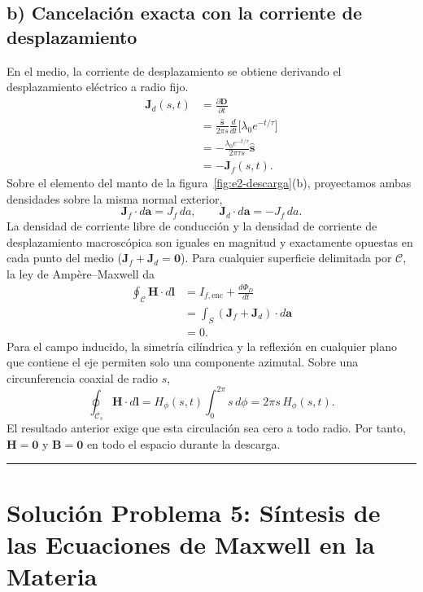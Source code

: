 \documentclass[11pt]{article}
\begin{document}
\subsection*{b) Cancelación exacta con la corriente de desplazamiento}
En el medio, la corriente de desplazamiento se obtiene derivando
el desplazamiento eléctrico a radio fijo.
\begin{align*}
    \mathbf J_d(s,t)
    &=\frac{\partial\mathbf D}{\partial t}\\
    &=\frac{\hat{\mathbf s}}{2\pi s}
       \frac{d}{dt}\bigl[\lambda_0e^{-t/\tau}\bigr]\\
    &=-\frac{\lambda_0e^{-t/\tau}}{2\pi\tau s}\hat{\mathbf s}\\
    &=-\mathbf J_f(s,t).
\end{align*}
Sobre el elemento del manto de la figura~\ref{fig:e2-descarga}(b),
proyectamos ambas densidades sobre la misma normal exterior,
\[
    \mathbf J_f\cdot d\mathbf a=J_f\,da,
    \qquad
    \mathbf J_d\cdot d\mathbf a=-J_f\,da.
\]
La densidad de corriente libre de conducción y la densidad de corriente de desplazamiento macroscópica son iguales en magnitud y exactamente opuestas en cada punto del medio ($\mathbf{J}_f + \mathbf{J}_d = \mathbf{0}$).
Para cualquier superficie delimitada por $\mathcal C$, la ley
de Ampère--Maxwell da
\begin{align*}
    \oint_{\mathcal C}\mathbf H\cdot d\mathbf l
    &= I_{f,\mathrm{enc}}+\frac{d\Phi_D}{dt}\\
    &=\int_S(\mathbf J_f+\mathbf J_d)\cdot d\mathbf a\\
    &=0.
\end{align*}
Para el campo inducido, la simetría cilíndrica y la reflexión
en cualquier plano que contiene el eje permiten solo una componente
azimutal. Sobre una circunferencia coaxial de radio $s$,
\[
    \oint_{\mathcal C_s}\mathbf H\cdot d\mathbf l
    =H_\phi(s,t)\int_0^{2\pi}s\,d\phi=2\pi s\,H_\phi(s,t).
\]
El resultado anterior exige que esta circulación sea cero a todo
radio. Por tanto, $\mathbf H=\mathbf0$ y $\mathbf B=\mathbf0$
en todo el espacio durante la descarga.


\vspace{0.4cm}
\hrule
\vspace{0.5cm}

\section*{Solución Problema 5: Síntesis de las Ecuaciones de Maxwell en la Materia}
\end{document}
